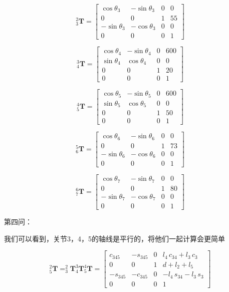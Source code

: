 \documentclass{homework}
\begin{document}
\begin{sol}
\[
  _3^2\mathbf{T} =
  \begin{bmatrix}
    \cos\theta_3 & -\sin\theta_3 & 0 & 0 \\
    0 & 0 & 1 & 55 \\
    -\sin\theta_3 & -\cos\theta_3 & 0 & 0 \\
    0 & 0 & 0 & 1
  \end{bmatrix}
\]

\[
  _4^3\mathbf{T} =
  \begin{bmatrix}
    \cos\theta_4 & -\sin\theta_4 & 0 & 600 \\
    \sin\theta_4 & \cos\theta_4 & 0 & 0 \\
    0 & 0 & 1 & 20 \\
    0 & 0 & 0 & 1
  \end{bmatrix}
\]

\[
  _5^4\mathbf{T} =
  \begin{bmatrix}
    \cos\theta_5 & -\sin\theta_5 & 0 & 600 \\
    \sin\theta_5 & \cos\theta_5 & 0 & 0 \\
    0 & 0 & 1 & 50 \\
    0 & 0 & 0 & 1
  \end{bmatrix}
\]

\[
  _6^5\mathbf{T} =
  \begin{bmatrix}
    \cos\theta_6 & -\sin\theta_6 & 0 & 0 \\
    0 & 0 & 1 & 73 \\
    -\sin\theta_6 & -\cos\theta_6 & 0 & 0 \\
    0 & 0 & 0 & 1
  \end{bmatrix}
\]

\[
  _7^6\mathbf{T} =
  \begin{bmatrix}
    \cos\theta_7 & -\sin\theta_7 & 0 & 0 \\
    0 & 0 & 1 & 80 \\
    -\sin\theta_7 & -\cos\theta_7 & 0 & 0 \\
    0 & 0 & 0 & 1
  \end{bmatrix}
\]

第四问：

我们可以看到，关节3，4，5的轴线是平行的，将他们一起计算会更简单

\[
  _5^2\mathbf{T} = _3^2\mathbf{T} _4^3\mathbf{T} _5^4\mathbf{T} =
  \begin{bmatrix} 
    c_{345} & -s_{345} & 0 & l_{4}\,c_{34}+l_{3}\,c_{3} \\ 
    0 & 0 & 1 & d+l_{2}+l_{5} \\ 
    -s_{345} & -c_{345} & 0 & -l_{4}\,s_{34}-l_{3}\,s_{3} \\ 
    0 & 0 & 0 & 1
  \end{bmatrix}
\]


\end{sol}
\end{document}

